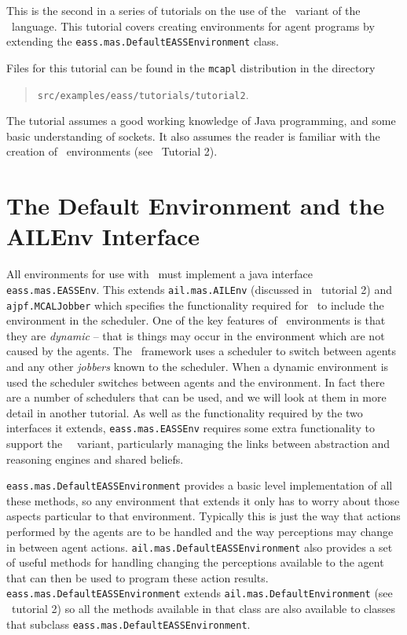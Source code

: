 
This is the second in a series of tutorials on the use of the \eass\ variant of the \gwendolen\ language.  This tutorial covers creating environments for agent programs by extending the \texttt{eass.mas.DefaultEASSEnvironment} class.  

Files for this tutorial can be found in the \texttt{mcapl} distribution in the directory 
\begin{quote}
\texttt{src/examples/eass/tutorials/tutorial2}.
\end{quote}

The tutorial assumes a good working knowledge of Java programming, and some basic understanding of sockets.  It also assumes the reader is familiar with the creation of \ail\ environments (see \ail\ Tutorial 2).

\section{The Default Environment and the AILEnv Interface}
\begin{sloppypar}
All environments for use with \eass\ must implement a java interface \texttt{eass.mas.EASSEnv}.  This extends \texttt{ail.mas.AILEnv} (discussed in \ail\ tutorial 2) and \texttt{ajpf.MCALJobber} which specifies the functionality required for \ajpf\ to include the environment in the scheduler.  One of the key features of \eass\ environments is that they are \emph{dynamic} -- that is things may occur in the environment which are not caused by the agents.  The \ajpf\ framework uses a scheduler to switch between agents and any other \emph{jobbers} known to the scheduler.  When a dynamic environment is used the scheduler switches between agents and the environment.  In fact there are a number of schedulers that can be used, and we will look at them in more detail in another tutorial.  As well as the functionality required by the two interfaces it extends, \texttt{eass.mas.EASSEnv} requires some extra functionality to support the \eass\ \gwendolen\ variant, particularly managing the links between abstraction and reasoning engines and shared beliefs.

\texttt{eass.mas.DefaultEASSEnvironment} provides a basic level implementation of all these methods, so any environment that extends it only has to worry about those aspects particular to that environment.  Typically this is just the way that actions performed by the agents are to be handled and the way perceptions may change in between agent actions.  \texttt{ail.mas.DefaultEASSEnvironment} also provides a set of useful methods for handling changing the perceptions available to the agent that can then be used to program these action results.  \texttt{eass.mas.DefaultEASSEnvironment} extends \texttt{ail.mas.DefaultEnvironment} (see \ail\ tutorial 2) so all the methods available in that class are also available to classes that subclass \texttt{eass.mas.DefaultEASSEnvironment}.
\end{sloppypar}

